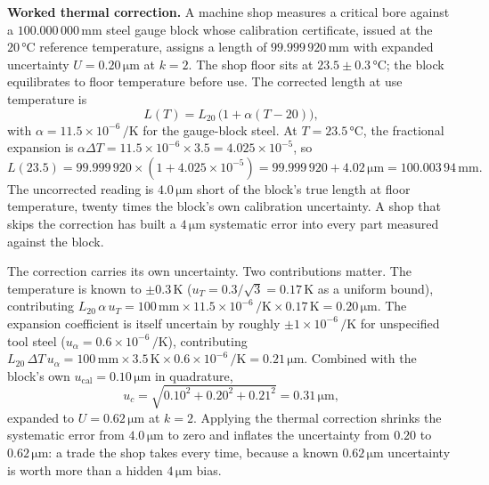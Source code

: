 

\textbf{Worked thermal correction.} A machine shop measures a
critical bore against a $100.000\,000\,\si{\milli\meter}$ steel gauge
block whose calibration certificate, issued at the
$20\,\si{\degreeCelsius}$ reference temperature, assigns a length of
$99.999\,920\,\si{\milli\meter}$ with expanded uncertainty
$U = 0.20\,\si{\micro\meter}$ at $k = 2$. The shop floor sits at
$23.5 \pm 0.3\,\si{\degreeCelsius}$; the block equilibrates to floor
temperature before use. The corrected length at use temperature is
\[
L(T) = L_{20}\,\bigl(1 + \alpha (T - 20)\bigr),
\]
with $\alpha = 11.5 \times 10^{-6}\,\si{\per\kelvin}$ for the
gauge-block steel. At $T = 23.5\,\si{\degreeCelsius}$, the fractional
expansion is $\alpha \Delta T = 11.5 \times 10^{-6} \times 3.5 =
4.025 \times 10^{-5}$, so
\[
L(23.5) = 99.999\,920 \times (1 + 4.025 \times 10^{-5})
= 99.999\,920 + 4.02\,\si{\micro\meter}
= 100.003\,94\,\si{\milli\meter}.
\]
The uncorrected reading is $4.0\,\si{\micro\meter}$ short of the
block's true length at floor temperature, twenty times the block's
own calibration uncertainty. A shop that skips the correction has
built a $4\,\si{\micro\meter}$ systematic error into every part
measured against the block.

The correction carries its own uncertainty. Two contributions matter.
The temperature is known to $\pm 0.3\,\si{\kelvin}$ ($u_{T} = 0.3 /
\sqrt{3} = 0.17\,\si{\kelvin}$ as a uniform bound), contributing
$L_{20}\,\alpha\,u_{T} = 100\,\si{\milli\meter} \times 11.5 \times
10^{-6}\,\si{\per\kelvin} \times 0.17\,\si{\kelvin} = 0.20\,\si{\micro
\meter}$. The expansion coefficient is itself uncertain by roughly
$\pm 1 \times 10^{-6}\,\si{\per\kelvin}$ for unspecified tool steel
($u_{\alpha} = 0.6 \times 10^{-6}\,\si{\per\kelvin}$), contributing
$L_{20}\,\Delta T\,u_{\alpha} = 100\,\si{\milli\meter} \times
3.5\,\si{\kelvin} \times 0.6 \times 10^{-6}\,\si{\per\kelvin} =
0.21\,\si{\micro\meter}$. Combined with the block's own
$u_{\text{cal}} = 0.10\,\si{\micro\meter}$ in quadrature,
\[
u_{c} = \sqrt{0.10^{2} + 0.20^{2} + 0.21^{2}}
= 0.31\,\si{\micro\meter},
\]
expanded to $U = 0.62\,\si{\micro\meter}$ at $k = 2$. Applying the
thermal correction shrinks the systematic error from
$4.0\,\si{\micro\meter}$ to zero and inflates the uncertainty from
$0.20$ to $0.62\,\si{\micro\meter}$: a trade the shop takes every
time, because a known $0.62\,\si{\micro\meter}$ uncertainty is worth
more than a hidden $4\,\si{\micro\meter}$ bias.

